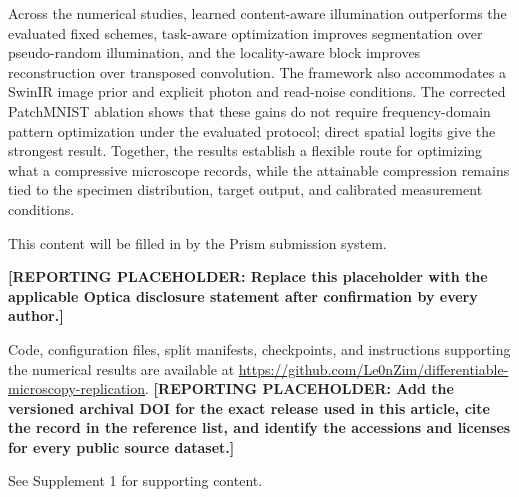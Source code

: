 \documentclass{optica-article}
\newcommand{\reportingplaceholder}[1]{\textbf{[REPORTING PLACEHOLDER: #1]}}
\begin{document}
Across the numerical studies, learned content-aware illumination outperforms the evaluated fixed schemes, task-aware optimization improves segmentation over pseudo-random illumination, and the locality-aware block improves reconstruction over transposed convolution. The framework also accommodates a SwinIR image prior and explicit photon and read-noise conditions. The corrected PatchMNIST ablation shows that these gains do not require frequency-domain pattern optimization under the evaluated protocol; direct spatial logits give the strongest result. Together, the results establish a flexible route for optimizing what a compressive microscope records, while the attainable compression remains tied to the specimen distribution, target output, and calibrated measurement conditions.

\begin{backmatter}

This content will be filled in by the Prism submission system.

\reportingplaceholder{Replace this placeholder with the applicable Optica disclosure statement after confirmation by every author.}

Code, configuration files, split manifests, checkpoints, and instructions supporting the numerical results are available at \url{https://github.com/Le0nZim/differentiable-microscopy-replication}. \reportingplaceholder{Add the versioned archival DOI for the exact release used in this article, cite the record in the reference list, and identify the accessions and licenses for every public source dataset.}

See Supplement 1 for supporting content.

\end{backmatter}


\end{document}
